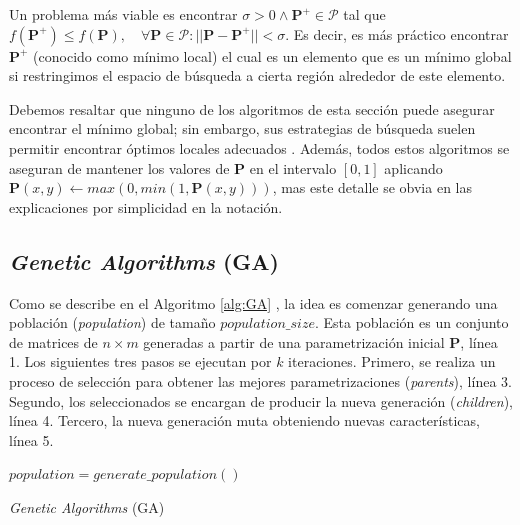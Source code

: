 Un problema más viable es encontrar $\sigma > 0 \land \boldsymbol{P^{+}} \in \pmb{\mathscr{P}}$ 
tal que 
$f(\boldsymbol{P^{+}}) \leq f(\boldsymbol{P}), \quad \forall \boldsymbol{P} \in \pmb{\mathscr{P}}:
|| \boldsymbol{P} - \boldsymbol{P^{+}}|| < \sigma$.
Es decir, es más práctico encontrar $\boldsymbol{P^{+}}$ (conocido como mínimo local)
el cual es un elemento que es un mínimo global si restringimos el espacio de búsqueda a cierta región
alrededor de este elemento.

Debemos resaltar que ninguno de los algoritmos de esta sección puede asegurar encontrar el mínimo global;
sin embargo, sus estrategias de búsqueda suelen permitir encontrar 
óptimos locales adecuados \citep{Angeris2021, Schneider2019}.
Además, todos estos algoritmos se aseguran de mantener los valores de $\boldsymbol{P}$ en el
intervalo $[0, 1]$ aplicando $\boldsymbol{P}(x, y) \gets max(0, min(1, \boldsymbol{P}(x, y)))$, mas
este detalle se obvia en las explicaciones por simplicidad en la notación.

\subsection{\emph{Genetic Algorithms} (GA)}\label{sec:ga}

Como se describe en el Algoritmo \ref{alg:GA} \citep{Mykel2019}, la idea es 
comenzar generando una población (\emph{population}) de tamaño $population\_size$.
Esta población es un conjunto de matrices de $n \times m$ generadas a partir de una parametrización
inicial $\boldsymbol{P}$, línea 1.
Los siguientes tres pasos se ejecutan por $k$ iteraciones.
Primero, se realiza un proceso de selección para obtener las mejores parametrizaciones
(\emph{parents}), línea 3.
Segundo, los seleccionados se encargan de producir la nueva generación
(\emph{children}), línea 4.
Tercero, la nueva generación muta obteniendo nuevas características, línea 5.

\begin{algorithm}
{}
$population = generate\_population()$ \\
\caption{\emph{Genetic Algorithms} (GA)}
\label{alg:GA}
\end{algorithm}

